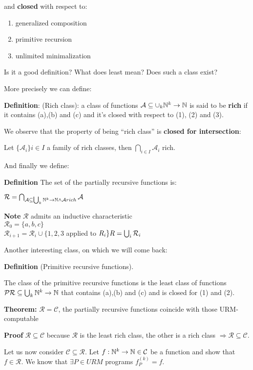 and \textbf{closed} with respect to:
\begin{enumerate}
\item generalized composition
\item primitive recursion
\item unlimited minimalization
\end{enumerate}

Is it a good definition? What does least mean? Does such a class exist?

More precisely we can define:

\textbf{Definition}: (Rich class): a class of functions $\mathcal{A} \subseteq \cup_k \mathbb{N}^k\rightarrow\mathbb{N}$ is said to be \textbf{rich} if it contains (a),(b) and (c) and it's closed with respect to (1), (2) and (3).

We observe that the property of being ``rich class'' is \textbf{closed for intersection}:

Let $\{\mathcal{A}_i\}i\in I$ a family of rich classes, then $\bigcap_{i\in I}\mathcal{A}_i$ rich.

And finally we define:

\textbf{Definition} The set of the partially recursive functions is:

$\mathcal{R} = \bigcap_{\mathcal{A} \subseteq \bigcup_k \mathbb{N}^k\rightarrow\mathbb{N}
\land
\mathcal{A}rich} \mathcal{A}$

\textbf{Note} $\mathcal{R}$ admits an inductive characteristic\\
$\mathcal{R}_0 = \{a,b,c\}$\\
$\mathcal{R}_{i+1} = \mathcal{R}_i \cup \{1,2,3 $ applied to $ R_i\}\\
R = \bigcup_i \mathcal{R}_i$

Another interesting class, on which we will come back:

\textbf{Definition} (Primitive recursive functions).

The class of the primitive recursive functions is the least class of functions $\mathcal{PR}\subseteq \bigcup_k\mathbb{N}^k\rightarrow\mathbb{N}$ that contains (a),(b) and (c) and is closed for (1) and (2).

\textbf{Theorem:} $\mathcal{R} = \mathcal{C}$, the partially recursive functions coincide with those URM-computable

\textbf{Proof} $ \mathcal{R} \subseteq \mathcal{C} $ because $\mathcal{R}$ is the least rich class, the other is a rich class $\Rightarrow \mathcal{R}\subseteq\mathcal{C}$.

Let us now consider $ \mathcal{C} \subseteq \mathcal{R} $. Let $ f:\mathbb{N}^k\rightarrow\mathbb{N} \in \mathcal{C} $ be a function and show that $ f \in \mathcal{R} $. We know that $ \exists P \in URM $ programs $ f_P^{(k)} = f$.

